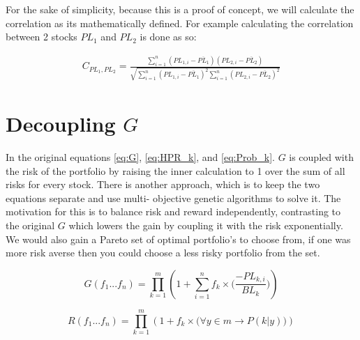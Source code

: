 \documentclass[11pt]{article}
\begin{document}
    For the sake of simplicity, because this is a proof of concept, we will calculate the
    correlation as its mathematically defined.
    For example calculating the correlation between 2 stocks \(PL_1\) and \(PL_2\) is
    done as so:

    \begin{align}
        C_{PL_1, PL_2} = 
        \frac{
            \displaystyle\sum^{n}_{i=1} (PL_{1, i} - \overline {PL_1})(PL_{2, i} - \overline {PL_2})
        }{
            \sqrt{
                \displaystyle\sum^{n}_{i=1}(PL_{1,i} - \overline {PL_1})^2 
                \displaystyle\sum^{n}_{i=1}(PL_{2,i} - \overline {PL_2})^2
            }
        }
        \label{eq:Correlation}
    \end{align}

\section{Decoupling \(G\)} \label{section:DecoupleG}

    In the original equations \ref{eq:G}, \ref{eq:HPR_k}, and \ref{eq:Prob_k}.
    \(G\) is coupled with the risk of the portfolio
    by raising the inner calculation to 1 over the sum of all risks for every stock.
    There is another approach, which is to keep the two equations separate and use multi-
    objective genetic algorithms to solve it. The motivation for this is to balance risk
    and reward independently, contrasting to the original \(G\) which lowers the gain
    by coupling it with the risk exponentially. We would also gain a Pareto set of
    optimal portfolio's to choose from, if one was more risk averse then you could choose
    a less risky portfolio from the set.

    \begin{equation}\label{eq:DecoupleG}
        G(f_1...f_n) = \displaystyle\prod^{m}_{k=1} \left(
                1 + \displaystyle\sum^{n}_{i=1} f_k \times \Big(
                    \frac{- PL_{k,i} }{BL_k}
                \Big)
            \right)
    \end{equation}

    \begin{equation}\label{eq:DecoupleR}
        R(f_1...f_n) = \displaystyle\prod^{m}_{k=1} \left(
                1 + f_k \times \Big(
                    \forall y \in m \to P(k|y)
                \Big)
            \right)
    \end{equation}
\end{document}
